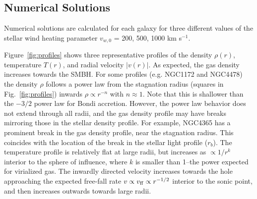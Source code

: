 \documentclass[usenatbib,fleqn]{mn2e}
\newcommand{\rb}{r_b}
\begin{document}

\subsection{Numerical Solutions}

Numerical solutions are calculated for each galaxy for three different values of the stellar wind heating parameter $v_{w,0}$ = 200, 500, 1000 km s$^{-1}$.  

Figure~\ref{fig:profiles} shows three representative profiles of the density $\rho(r)$, temperature $T(r)$, and radial velocity $|v(r)|$.  As expected, the gas density increases towards the SMBH.  For some profiles (e.g. NGC1172 and NGC4478) the density $\rho$ follows a power law from the stagnation radius (squares in Fig.~\ref{fig:profiles}) inwards $\rho \propto r^{-n}$ with $n \approx 1$. Note that this is shallower than the $-3/2$ power law for Bondi accretion. However, the power law behavior does not extend through all radii, and the gas density profile may have breaks mirroring those in the stellar density profile. For example, NGC4365 has a prominent break in the gas density profile, near the stagnation radius. This coincides with the location
of the break in the stellar light profile ($\rb$). The temperature profile is relatively flat at large radii, but increases as $\propto
1/r^{k}$ interior to the sphere of influence, where $k$ is smaller than 1--the power expected for virialized gas.  The inwardly
directed velocity increases towards the hole approaching the expected free-fall rate $v \propto v_{\rm ff}\propto r^{-1/2}$ interior to the sonic point, and then increases outwards towards large radii.
\end{document}
